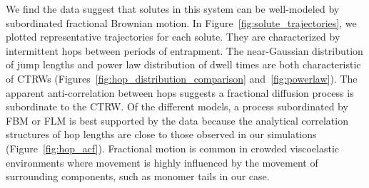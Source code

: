 \documentclass[aps,pre,preprint,groupedaddress]{revtex4-2}
\begin{document}
  We find the data suggest
  that solutes in this system can be well-modeled by subordinated
  fractional Brownian motion. In Figure~\ref{fig:solute_trajectories}, we plotted representative
  trajectories for each solute. They are characterized by intermittent hops between
  periods of entrapment. The near-Gaussian distribution of jump lengths and power law 
  distribution of dwell times are both characteristic of CTRWs 
  (Figures~\ref{fig:hop_distribution_comparison} and~\ref{fig:powerlaw}). The apparent
  anti-correlation between hops suggests a fractional diffusion process is subordinate 
  to the CTRW. Of the different models, a process subordinated by FBM or FLM is best 
  supported by the data because the analytical correlation structures of hop lengths are
  close to those observed in our simulations (Figure~\ref{fig:hop_acf}). Fractional 
  motion is common in crowded viscoelastic environments where movement is highly 
  influenced by the movement of surrounding components, such as monomer tails in our 
  case.~\cite{ernst_fractional_2012}
  
\end{document}
